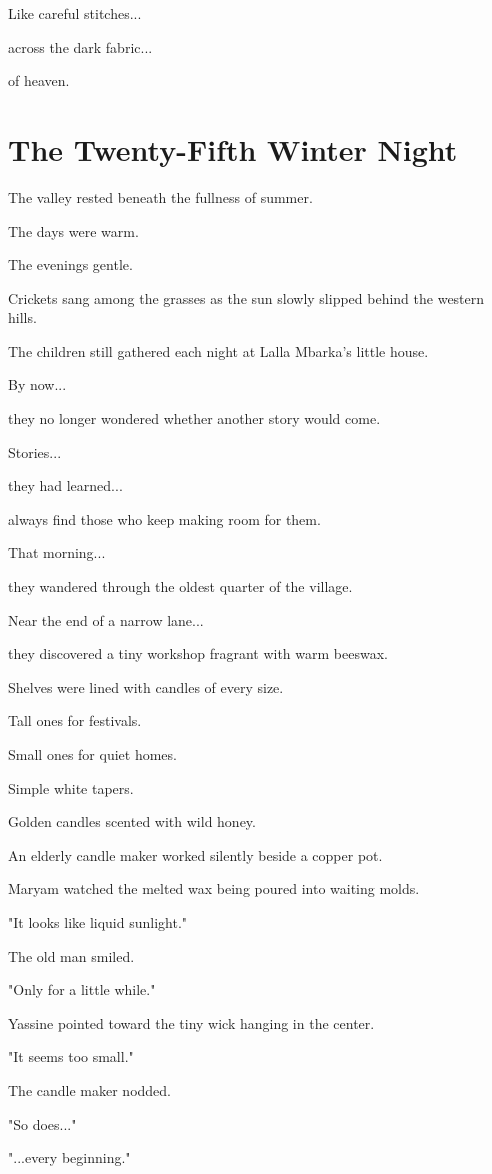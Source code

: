 \documentclass[12pt,openany]{book}
\begin{document}
Like careful stitches...

across the dark fabric...

of heaven.
\chapter{The Twenty-Fifth Winter Night}

The valley rested beneath the fullness of summer.

The days were warm.

The evenings gentle.

Crickets sang among the grasses as the sun slowly slipped behind the western hills.

The children still gathered each night at Lalla Mbarka's little house.

By now...

they no longer wondered whether another story would come.

Stories...

they had learned...

always find those who keep making room for them.

That morning...

they wandered through the oldest quarter of the village.

Near the end of a narrow lane...

they discovered a tiny workshop fragrant with warm beeswax.

Shelves were lined with candles of every size.

Tall ones for festivals.

Small ones for quiet homes.

Simple white tapers.

Golden candles scented with wild honey.

An elderly candle maker worked silently beside a copper pot.

Maryam watched the melted wax being poured into waiting molds.

"It looks like liquid sunlight."

The old man smiled.

"Only for a little while."

Yassine pointed toward the tiny wick hanging in the center.

"It seems too small."

The candle maker nodded.

"So does..."

"...every beginning."
\end{document}
